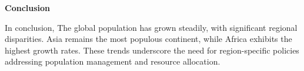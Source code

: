 \documentclass[12pt]{article}
\begin{document}


\newpage

\vspace{0.9in} 
\begin{center}
\Large
\textbf{Conclusion}
\vspace{0.1in} 
\end{center}
In conclusion,
    The global population has grown steadily, with significant regional disparities. Asia remains the most populous continent, while Africa exhibits the highest growth rates. These trends underscore the need for region-specific policies addressing population management and resource allocation.
\end{document}
